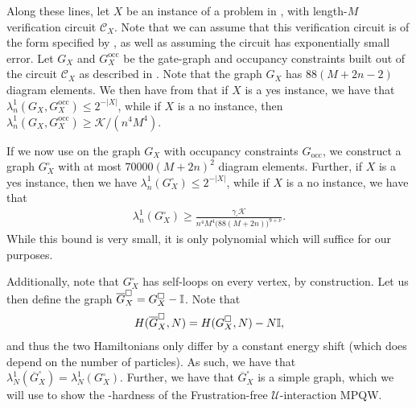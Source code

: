 \documentclass[../thesis-main/thesis-main]{subfiles}
\begin{document}
Along these lines, let $X$ be an instance of a problem in \QMA, with length-$M$ verification circuit $\mathcal{C}_X$.  Note that we can assume that this verification circuit is of the form specified by , as well as assuming the circuit has exponentially small error.  Let $G_X$ and $G_X^{\text{occ}}$ be the gate-graph and occupancy constraints built out of the circuit $\mathcal{C}_X$ as described in .  Note that the graph $G_X$ has $88(M+2n-2)$ diagram elements.  We then have from  that if $X$ is a yes instance, we have that $\lambda_n^1(G_X,G_X^\text{occ}) \leq 2^{-|X|}$, while if $X$ is a no instance, then $\lambda_n^1(G_X,G_X^{\text{occ}}) \geq \mathcal{K}/(n^4M^4)$.

If we now use  on the graph $G_X$ with occupancy constraints $G_\text{occ}$, we construct a graph $G_X^{\square}$ with at most $70000(M+2n)^2$ diagram elements.  Further, if $X$ is a yes instance, then we have $\lambda_n^1 (G_X^\square)  \leq 2^{-|X|}$, while if $X$ is a no instance, we have that 
\begin{align}
  \lambda_n^1(G_X^\square) \geq \frac{\gamma_\square \mathcal{K}}{n^4 M^4 \big(88(M+2n)\big)^{9+\nu}}.
\end{align}
While this bound is very small, it is only polynomial which will suffice for our purposes.

Additionally, note that $G_X^\square$ has self-loops on every vertex, by construction.  Let us then define the graph $\overline{G}_X^\square = G_X^\square - \mathbb{I}$.  Note that 
\begin{align}
  H(\overline{G}_X^\square,N) = H(G_X^\square,N) - N\mathbb{I},
\end{align}
and thus the two Hamiltonians only differ by a constant energy shift (which does depend on the number of particles).  As such, we have that $\lambda_N^1(\overline{G}_X^\square) = \lambda_N^1(G_X^\square)$.  Further, we have that $\overline{G}_X^\square$ is a simple graph, which we will use to show the \QMA-hardness of the Frustration-free $\mathcal{U}$-interaction MPQW.
\end{document}
